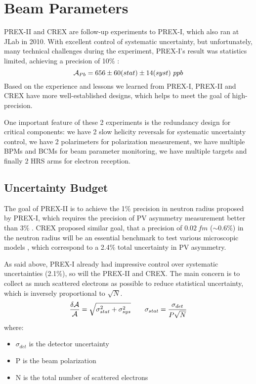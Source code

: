 \section{Beam Parameters}
PREX-II and CREX are follow-up experiments to PREX-I, which also ran at JLab in 2010. 
With excellent control of systematic uncertainty, but unfortunately, 
many technical challenges during the experiment, PREX-I's result was statistics 
limited, achieving a precision of 10\% \cite{PhysRevLett.108.112502}:
$$ \CA_{Pb} = 656 \pm 60 (stat) \pm 14 (syst) \ ppb$$
Based on the experience and lessons we learned from PREX-I, 
PREX-II and CREX have more well-established designs, which helps to
meet the goal of high-precision.

One important feature of these 2 experiments is the redundancy design for critical
components: we have 2 slow helicity reversals for systematic uncertainty control,
we have 2 polarimeters for polarization measurement, we have multiple BPMs and
BCMs for beam parameter monitoring, we have multiple \Pb targets and finally
2 HRS arms for electron reception.

\subsection{Uncertainty Budget}
The goal of PREX-II is to achieve the 1\% precision in \Pb neutron radius proposed
by PREX-I, which requires the precision of PV asymmetry measurement better than 3\% \cite{PhysRevLett.106.252501}. 
CREX proposed similar goal, that a precision of $0.02 \ fm$ ($\sim 0.6\%$) in the
\Ca neutron radius will be an essential benchmark to test various microscopic 
models \cite{crex_proposal}, which correspond to a 2.4\% total uncertainty in PV asymmetry.

As said above, PREX-I already had impressive control over systematic uncertainties (2.1\%),
so will the PREX-II and CREX. The main concern is to collect as much scattered 
electrons as possible to reduce statistical uncertainty, which is inversely 
proportional to $\sqrt{N}$.
\begin{equation}
    \frac{\delta \mathcal{A}}{\mathcal{A}} = \sqrt{\sigma^2_{stat} + \sigma^2_{sys}}	\qquad 
    \sigma_{stat} = \frac{\sigma_{det}}{P\sqrt{N}}
\end{equation}
where:
\begin{itemize}
    \item $\sigma_{det}$ is the detector uncertainty
    \item P is the beam polarization
    \item N is the total number of scattered electrons
\end{itemize}

